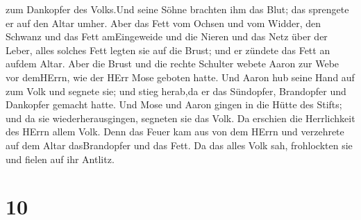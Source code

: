 zum Dankopfer des Volks.Und seine Söhne brachten ihm das Blut; das
sprengete er auf den Altar umher.  Aber das Fett vom Ochsen
und vom Widder, den Schwanz und das Fett amEingeweide und die Nieren und
das Netz über der Leber,  alles solches Fett legten sie auf
die Brust; und er zündete das Fett an aufdem Altar.  Aber
die Brust und die rechte Schulter webete Aaron zur Webe vor demHErrn,
wie der HErr Mose geboten hatte.  Und Aaron hub seine Hand
auf zum Volk und segnete sie; und stieg herab,da er das Sündopfer,
Brandopfer und Dankopfer gemacht hatte.  Und Mose und Aaron
gingen in die Hütte des Stifts; und da sie wiederherausgingen, segneten
sie das Volk. Da erschien die Herrlichkeit des HErrn allem Volk.
 Denn das Feuer kam aus von dem HErrn und verzehrete auf
dem Altar dasBrandopfer und das Fett. Da das alles Volk sah, frohlockten
sie und fielen auf ihr Antlitz.

\hypertarget{section-9}{%
\section{10}\label{section-9}}

